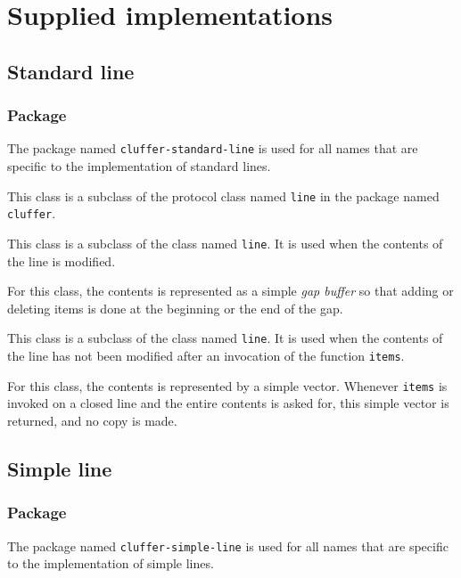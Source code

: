 \chapter{Supplied implementations}
\label{chap-supplied-implementations}

\section{Standard line}
\label{sec-standard-line}

\subsection{Package}

The package named \texttt{cluffer-standard-line} is used for all names
that are specific to the implementation of standard lines.


This class is a subclass of the protocol class named \texttt{line} in
the package named \texttt{cluffer}.


This class is a subclass of the class named \texttt{line}.  It is used
when the contents of the line is modified.

For this class, the contents is represented as a simple \emph{gap
  buffer} so that adding or deleting items is done at the beginning or
the end of the gap.


This class is a subclass of the class named \texttt{line}.  It is used
when the contents of the line has not been modified after an
invocation of the function \texttt{items}.

For this class, the contents is represented by a simple \commonlisp{}
vector.  Whenever \texttt{items} is invoked on a closed line and the
entire contents is asked for, this simple vector is returned, and no
copy is made.

\section{Simple line}

\subsection{Package}

The package named \texttt{cluffer-simple-line} is used for all names
that are specific to the implementation of simple lines.


